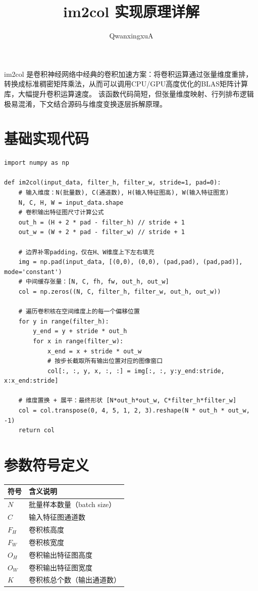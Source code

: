 \documentclass{article}
\title{im2col 实现原理详解}
\author{QwanxingxuA}
\begin{document}
\maketitle

im2col 是卷积神经网络中经典的卷积加速方案：将卷积运算通过张量维度重排，转换成标准稠密矩阵乘法，从而可以调用CPU/GPU高度优化的BLAS矩阵计算库，大幅提升卷积运算速度。
该函数代码简短，但张量维度映射、行列排布逻辑极易混淆，下文结合源码与维度变换逐层拆解原理。

\section{基础实现代码}
\begin{lstlisting}
import numpy as np

def im2col(input_data, filter_h, filter_w, stride=1, pad=0):
    # 输入维度：N(批量数), C(通道数), H(输入特征图高), W(输入特征图宽)
    N, C, H, W = input_data.shape
    # 卷积输出特征图尺寸计算公式
    out_h = (H + 2 * pad - filter_h) // stride + 1
    out_w = (W + 2 * pad - filter_w) // stride + 1

    # 边界补零padding，仅在H、W维度上下左右填充
    img = np.pad(input_data, [(0,0), (0,0), (pad,pad), (pad,pad)], mode='constant')
    # 中间缓存张量：[N, C, fh, fw, out_h, out_w]
    col = np.zeros((N, C, filter_h, filter_w, out_h, out_w))

    # 遍历卷积核在空间维度上的每一个偏移位置
    for y in range(filter_h):
        y_end = y + stride * out_h
        for x in range(filter_w):
            x_end = x + stride * out_w
            # 按步长截取所有输出位置对应的图像窗口
            col[:, :, y, x, :, :] = img[:, :, y:y_end:stride, x:x_end:stride]

    # 维度置换 + 展平：最终形状 [N*out_h*out_w, C*filter_h*filter_w]
    col = col.transpose(0, 4, 5, 1, 2, 3).reshape(N * out_h * out_w, -1)
    return col
\end{lstlisting}

\section{参数符号定义}
\begin{table}[htbp]
    \centering
    \begin{tabular}{l l}
        \hline
        符号 & 含义说明 \\
        \hline
        $N$ & 批量样本数量（batch size） \\
        \hline
        $C$ & 输入特征图通道数 \\
        \hline
        $F_H$ & 卷积核高度 \\
        \hline
        $F_W$ & 卷积核宽度 \\
        \hline
        $O_H$ & 卷积输出特征图高度 \\
        \hline
        $O_W$ & 卷积输出特征图宽度 \\
        \hline
        $K$ & 卷积核总个数（输出通道数） \\
        \hline
    \end{tabular}
\end{table}
\end{document}
